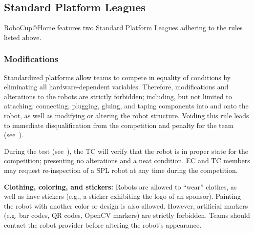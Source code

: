 \subsection{Standard Platform Leagues}
RoboCup@Home features two Standard Platform Leagues adhering to the rules listed above.

\subsubsection{Modifications}
\label{rule:spl-mods}
Standardized platforms allow teams to compete in equality of conditions by eliminating all hardware-dependent variables.
Therefore, modifications and alterations to the robots are strictly forbidden; including, but not limited to attaching, connecting, plugging, gluing, and taping components into and onto the robot, as well as modifying or altering the robot structure.
Voiding this rule leads to immediate disqualification from the competition and penalty for the team (see~).

During the  test (see~), the TC will verify that the robot is in proper state for the competition; presenting no alterations and a neat condition.
EC and TC members may request re-inspection of a SPL robot at any time during the competition.

\textbf{Clothing, coloring, and stickers:} Robots are allowed to \enquote{wear} clothes, as well as have stickers (e.g., a sticker exhibiting the logo of an sponsor).
Painting the robot with another color or design is also allowed. 
However, artificial markers (e.g. bar codes, QR codes, OpenCV markers) are strictly forbidden. 
Teams should contact the robot provider before altering the robot's appearance.


